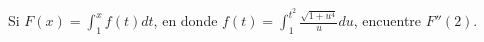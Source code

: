 \item Si $\displaystyle F(x) = \int_1^x f(t) dt$, en donde $\displaystyle f(t) = \int_1^{t^2} \frac{\sqrt{1 + u^4}}{u} du$, encuentre $F''(2)$.

